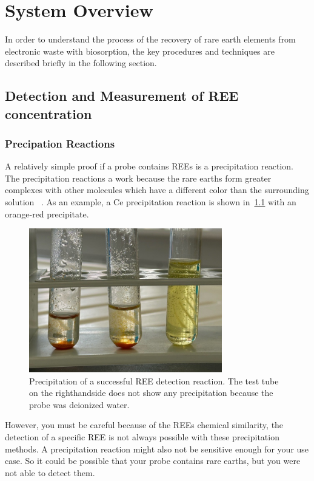 \chapter{System Overview}

In order to understand the process of the recovery of rare earth elements from electronic waste with biosorption, the key procedures and techniques are described briefly in the following section.


\section{Detection and Measurement of REE concentration\authorA}

\subsection{Precipation Reactions}
A relatively simple proof if a probe contains REEs is a precipitation reaction.
The precipitation reactions a work because the rare earths form greater complexes with other molecules which have a different color than the surrounding solution ~\cite{janderblasius}.
As an example, a Ce precipitation reaction is shown in~\ref{fig:cer_precipitation_cropped} with an orange-red precipitate.

\begin{figure}[H]
    \centering
    \includegraphics[width=0.75\textwidth]{./media/images/ree_precipitation_reaction_cropped}
    \caption{Precipitation of a successful REE detection reaction. The test tube on the righthandside does not show any precipitation because the probe was deionized water.}
    \label{fig:cer_precipitation_cropped}
\end{figure}

However, you must be careful because of the REEs chemical similarity, the detection of a specific REE is not always possible with these precipitation methods.
A precipitation reaction might also not be sensitive enough for your use case.
So it could be possible that your probe contains rare earths, but you were not able to detect them.

